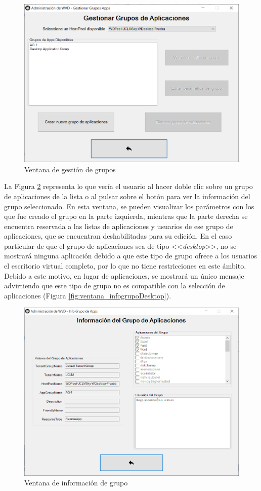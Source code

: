 \begin{figure}[h]
  \centering
  \includegraphics[width=0.7\linewidth]{figures/images/script/ventana_gestion.PNG}
  \caption{Ventana de gestión de grupos}
  \label{fig:ventana_gestion}
\end{figure}

La Figura \ref{fig:ventana_infogrupo} representa lo que vería el usuario al hacer doble clic sobre un grupo de aplicaciones de la lista o al pulsar sobre el botón para ver la información del grupo seleccionado. En esta ventana, se pueden visualizar los parámetros con los que fue creado el grupo en la parte izquierda, mientras que la parte derecha se encuentra reservada a las listas de aplicaciones y usuarios de ese grupo de aplicaciones, que se encuentran deshabilitadas para su edición. En el caso particular de que el grupo de aplicaciones sea de tipo <<\textit{desktop}>>, no se mostrará ninguna aplicación debido a que este tipo de grupo ofrece a los usuarios el escritorio virtual completo, por lo que no tiene restricciones en este ámbito. Debido a este motivo, en lugar de aplicaciones, se mostrará un único mensaje advirtiendo que este tipo de grupo no es compatible con la selección de aplicaciones (Figura \ref{fig:ventana_infogrupoDesktop}).

\begin{figure}[h]
  \centering
  \includegraphics[width=0.7\linewidth]{figures/images/script/ventana_infogrupo.PNG}
  \caption{Ventana de información de grupo}
  \label{fig:ventana_infogrupo}
\end{figure}

